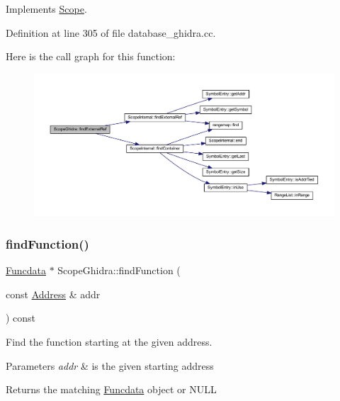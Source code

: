 Implements \mbox{\hyperlink{class_scope_af69e0f77b621a3ba6436f8a1c0010d1c}{Scope}}.



Definition at line 305 of file database\+\_\+ghidra.\+cc.

Here is the call graph for this function\+:
\nopagebreak
\begin{figure}[H]
\begin{center}
\leavevmode
\includegraphics[width=350pt]{class_scope_ghidra_a0de8e7d9e97f48516f8bb7b5edd4dfcd_cgraph}
\end{center}
\end{figure}
\mbox{\label{class_scope_ghidra_a8bc17a80d5b2bd69f7900be5b55a382a}} 
\subsubsection{\texorpdfstring{findFunction()}{findFunction()}}
{\footnotesize\ttfamily \mbox{\hyperlink{class_funcdata}{Funcdata}} $\ast$ Scope\+Ghidra\+::find\+Function (\begin{DoxyParamCaption}\item[{const \mbox{\hyperlink{class_address}{Address}} \&}]{addr }\end{DoxyParamCaption}) const\hspace{0.3cm}{\ttfamily [virtual]}}



Find the function starting at the given address. 


\begin{DoxyParams}{Parameters}
{\em addr} & is the given starting address \\
\hline
\end{DoxyParams}
\begin{DoxyReturn}{Returns}
the matching \mbox{\hyperlink{class_funcdata}{Funcdata}} object or N\+U\+LL 
\end{DoxyReturn}


